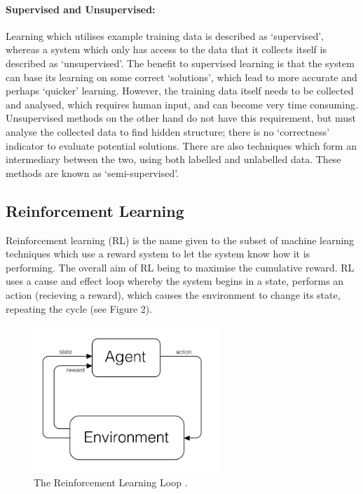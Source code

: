 \documentclass[a4paper,oneside]{report}
\begin{document}
\paragraph{Supervised and Unsupervised:} Learning which utilises example training data is described as `supervised', whereas a system which only has access to the data that it collects itself is described as `unsupervised'. The benefit to supervised learning is that the system can base its learning on some correct `solutions', which lead to more accurate and perhaps `quicker' learning. However, the training data itself needs to be collected and analysed, which requires human input, and can become very time consuming. Unsupervised methods on the other hand do not have this requirement, but must analyse the collected data to find hidden structure; there is no `correctness' indicator to evaluate potential solutions. There are also techniques which form an intermediary between the two, using both labelled and unlabelled data. These methods are known as `semi-supervised'.

\subsection{Reinforcement Learning}

Reinforcement learning (RL) is the name given to the subset of machine learning techniques which use a reward system to let the system know how it is performing. The overall aim of RL being to maximise the cumulative reward. RL uses a cause and effect loop whereby the system begins in a state, performs an action (recieving a reward), which causes the environment to change its state, repeating the cycle (see Figure 2).

\begin{figure}[h!]
  \centering
    \includegraphics[width=70mm]{sources/images/RLDiagram}
    \caption{The Reinforcement Learning Loop \cite{Nilsson:2010qa}.\label{screen}}
\end{figure}
\end{document}
